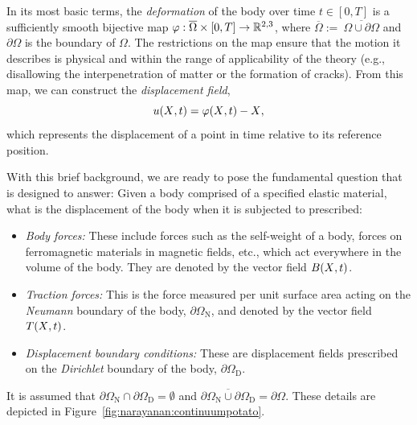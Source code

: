 In its most basic terms, the {\em deformation} of the body over time
$t \in [0, T]$ is a sufficiently smooth bijective map $\mbox{$\varphi$}:
\overline{\Omega} \times [0,T] \rightarrow \mathbb{R}^{2, 3}$, where
$\overline{\Omega} :=\ \overline{\Omega\cup\partial\Omega}$ and
$\partial\Omega$ is the boundary of $\Omega$. The restrictions on the
map ensure that the motion it describes is physical and within the
range of applicability of the theory (e.g., disallowing the
interpenetration of matter or the formation of cracks). From this map,
we can construct the {\em displacement field},
\begin{equation}
  \mbox{$ u$}(\mbox{$ X$}, t) = \mbox{$\varphi$}(\mbox{$ X$}, t) - \mbox{$ X$},
\end{equation}
which represents the displacement of a point in time
relative to its reference position.

With this brief background, we are ready to pose the fundamental
question that \twist{} is designed to answer: Given a body comprised
of a specified elastic material, what is the displacement of the body
when it is subjected to prescribed:
\begin{itemize}
\item {\em Body forces:} These include forces such as the self-weight
  of a body, forces on ferromagnetic materials in magnetic fields,
  etc., which act everywhere in the volume of the body. They are
  denoted by the vector field $\mbox{$ B$}(\mbox{$ X$}, t)$.
\item {\em Traction forces:} This is the force measured per unit
  surface area acting on the {\em Neumann} boundary of the body,
  $\partial\Omega_{\mathrm{N}}$, and denoted by the vector field
  $\mbox{$ T$}(\mbox{$ X$}, t)$.
\item {\em Displacement boundary conditions:} These are displacement
  fields prescribed on the {\em Dirichlet} boundary of the body,
  $\partial\Omega_{\mathrm{D}}$.
\end{itemize}
It is assumed that $\partial\Omega_{\mathrm{N}}
\cap \partial\Omega_{\mathrm{D}} = \emptyset$ and
$\overline{\partial\Omega_{\mathrm{N}} \cup \partial\Omega_{\mathrm{D}}}
= \partial\Omega$. These details are depicted in
Figure~\ref{fig:narayanan:continuumpotato}.

